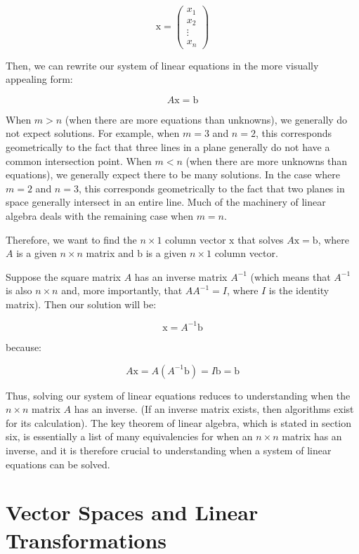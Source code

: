\documentclass[
]{book}
\theoremstyle{definition}
\theoremstyle{definition}
\theoremstyle{definition}
\theoremstyle{definition}
\theoremstyle{remark}
\begin{document}
\[
\mathrm{x} = \begin{pmatrix} x_1 \\ x_2 \\ \vdots \\ x_n \end{pmatrix}
\]

Then, we can rewrite our system of linear equations in the more visually appealing form:

\[
A \mathrm{x} = \mathrm{b}
\]

When \(m > n\) (when there are more equations than unknowns), we generally do not expect solutions. For example, when \(m = 3\) and \(n = 2\), this corresponds geometrically to the fact that three lines in a plane generally do not have a common intersection point. When \(m < n\) (when there are more unknowns than equations), we generally expect there to be many solutions. In the case where \(m = 2\) and \(n = 3\), this corresponds geometrically to the fact that two planes in space generally intersect in an entire line. Much of the machinery of linear algebra deals with the remaining case when \(m = n\).

Therefore, we want to find the \(n \times 1\) column vector \(\mathrm{x}\) that solves \(A \mathrm{x} = \mathrm{b}\), where \(A\) is a given \(n \times n\) matrix and \(\mathrm{b}\) is a given \(n \times 1\) column vector.

Suppose the square matrix \(A\) has an inverse matrix \(A^{-1}\) (which means that \(A^{-1}\) is also \(n \times n\) and, more importantly, that \(A A^{-1} = I\), where \(I\) is the identity matrix). Then our solution will be:

\[
\mathrm{x} = A^{-1} \mathrm{b}
\]

because:

\[
A \mathrm{x} = A (A^{-1} \mathrm{b}) = I \mathrm{b} = \mathrm{b}
\]

Thus, solving our system of linear equations reduces to understanding when the \(n \times n\) matrix \(A\) has an inverse. (If an inverse matrix exists, then algorithms exist for its calculation). The key theorem of linear algebra, which is stated in section six, is essentially a list of many equivalencies for when an \(n \times n\) matrix has an inverse, and it is therefore crucial to understanding when a system of linear equations can be solved.

\hypertarget{vector-spaces-and-linear-transformations}{%
\section{Vector Spaces and Linear Transformations}\label{vector-spaces-and-linear-transformations}}
\end{document}
